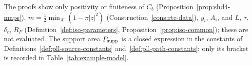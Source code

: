 The proofs show only positivity or finiteness of $C_b$ (Proposition~\ref{prop:shd4-maps}),
$m=\frac12\min_{\mathcal K}(1-\pi|z|^2)$ (Construction~\ref{cons:rtc-data}), $y_i$, $A_i$, and $L$, $\tau$, $\delta_c$,
$R_F$ (Definition~\ref{def:iso-parameters}, Proposition~\ref{prop:iso-common}); these are not evaluated. The support
area $P_{\rm supp}$ is a closed expression in the constants of Definitions~\ref{def:pll-source-constants}
and~\ref{def:pll-path-constants}; only its bracket is recorded in Table~\ref{tab:example-model}.
